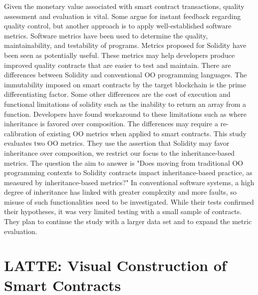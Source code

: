 \documentclass{article}
\begin{document}
Given the monetary value associated with smart contract transactions, quality assessment and evaluation is vital. Some argue for instant feedback regarding quality control, but another approach is to apply well-established software metrics. Software metrics have been used to determine the quality, maintainability, and testability of programs. Metrics proposed for Solidity have been seen as potentially useful. These metrics may help developers produce improved quality contracts that are easier to test and maintain. There are differences between Solidity and conventional OO programming languages. The immutability imposed on smart contracts by the target blockchain is the prime differentiating factor. Some other differences are the cost of execution and functional limitations of solidity such as the inability to return an array from a function. Developers have found workaround to these limitations such as where inheritance is favored over composition. The differences may require a re-calibration of existing OO metrics when applied to smart contracts. This study evaluates two OO metrics. They use the assertion that Solidity may favor inheritance over composition, we restrict our focus to the inheritance-based metrics. The question the aim to answer is "Does moving from traditional OO programming contexts to Solidity contracts impact inheritance-based practice, as measured by inheritance-based metrics?" In conventional software systems, a high degree of inheritance has linked with greater complexity and more faults, so misuse of such functionalities need to be investigated. While their tests confirmed their hypotheses, it was very limited testing with a small sample of contracts. They plan to continue the study with a larger data set and to expand the metric evaluation.

\section{LATTE: Visual Construction of Smart Contracts \cite{Latte}}
\end{document}

